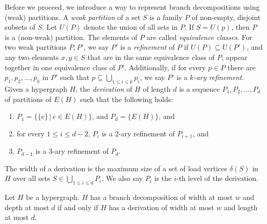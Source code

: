 Before we proceed, we introduce a way to represent branch decompositions using (weak) partitions.
A {\em weak partition} of a set $S$ is a family $P$ of non-empty, disjoint subsets of $S$.
Let $U(P)$ denote the union of all sets in $P$.
If $S = U(p)$, then $P$ is a (non-weak) partition.
The elements of $P$ are called {\em equivalence classes}.
For two weak partitions $P,P'$, we say $P'$ is a {\em refinement} of $P$ if $U(P) \subseteq U(P')$, and any two elements $x,y \in S$ that are in the same equivalence class of $P$, appear together in one equivalence class of $P'$.
Additionally, if for every $p \in P$ there are $p_1, p_2, ..., p_k$ in $P'$ such that $p \subseteq \bigcup_{1 \leq i \leq k}p_i$, we say $P'$ is a {\em $k$-ary refinement}.
Given a hypergraph $H$, the {\em derivation} of $H$ of length $d$ is a sequence $P_1, P_2, ..., P_d$ of partitions of $E(H)$ such that the following holds:
\begin{enumerate}
	\item $P_1 = \{ \{e\} \, | \, e \in E(H) \}$, and $P_d = \{ E(H) \}$, and
	\item for every $1 \leq i \leq d-2$, $P_i$ is a 2-ary refinement of $P_{i+1}$, and
	\item $P_{d-1}$ is a 3-ary refinement of $P_d$.
\end{enumerate}
The width of a derivation is the maximum size of a set of load vertices $\delta(S)$ in $H$ over all sets $S \in \bigcup_{1\leq i \leq d} P_i$.
We also say $P_i$ is the $i$-th level of the derivation.

\begin{lemma}
	Let $H$ be a hypergraph.
	$H$ has a branch decomposition of width at most $w$ and depth at most $d$ if and only if $H$ has a derivation of width at most $w$ and length at most $d$.
\end{lemma}

